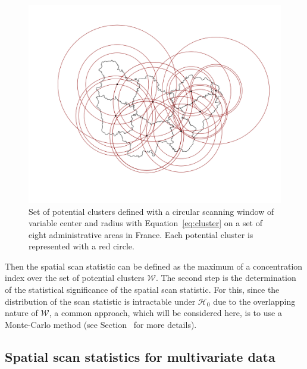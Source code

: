\begin{figure}[htbp]
\centering
\includegraphics[width=0.6\linewidth]{clusters_all.png}
\caption{Set of potential clusters defined with a circular scanning window of variable center and radius with Equation~\ref{eq:cluster} on a set of eight administrative areas in France. Each potential cluster is represented with a red circle.}
\label{fig:potentialclusters}
\end{figure}

\noindent Then the spatial scan statistic can be defined as the maximum of a concentration index over the set of potential clusters $\mathcal{W}$. The second step is the determination of the statistical significance of the spatial scan statistic. For this, since the distribution of the scan statistic is intractable under $\mathcal{H}_0$ due to the overlapping nature of $\mathcal{W}$, a common approach, which will be considered here, is to use a Monte-Carlo method (see Section~ for more details).



\subsection{Spatial scan statistics for multivariate data} \label{subsec:multi}

